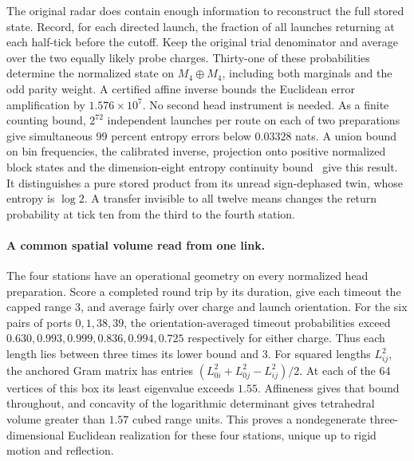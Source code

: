 \documentclass[11pt]{article}
\begin{document}
The original radar does contain enough information to reconstruct
the full stored state. Record, for each directed launch, the fraction
of all launches returning at each half-tick before the cutoff. Keep
the original trial denominator and average over the two equally
likely probe charges. Thirty-one of these probabilities determine
the normalized state on $M_4\oplus M_4$, including both marginals
and the odd parity weight. A certified affine inverse bounds the
Euclidean error amplification by $1.576\times10^7$. No second
head instrument is needed. As a finite counting bound, $2^{72}$
independent launches per route on each of two preparations give
simultaneous 99 percent entropy errors below $0.03328$ nats.
A union bound on bin frequencies, the calibrated inverse, projection
onto positive normalized block states and the dimension-eight
entropy continuity bound~\cite{audenaert07} give this result. It
distinguishes a pure stored product from its unread sign-dephased
twin, whose entropy is $\log 2$. A transfer invisible to all
twelve means changes the return probability at tick ten from the
third to the fourth station.

\paragraph{A common spatial volume read from one link.}
The four stations have an operational geometry on every normalized
head preparation. Score a completed round trip by its duration, give
each timeout the capped range 3, and average fairly over charge and
launch orientation. For the six pairs of ports $0,1,38,39$, the
orientation-averaged timeout probabilities exceed
$0.630,0.993,0.999,0.836,0.994,0.725$ respectively for either charge.
Thus each length lies between three times its lower bound and 3.
For squared lengths $L_{ij}^2$, the anchored Gram matrix has entries
$(L_{0i}^2+L_{0j}^2-L_{ij}^2)/2$. At each of the 64 vertices of
this box its least eigenvalue exceeds $1.55$. Affineness gives that
bound throughout, and concavity of the logarithmic determinant gives
tetrahedral volume greater than $1.57$ cubed range units. This proves
a nondegenerate three-dimensional Euclidean realization for these four
stations, unique up to rigid motion and reflection.
\end{document}
